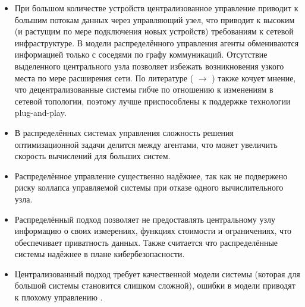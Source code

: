 \documentclass{report}
\begin{document}
\begin{itemize}

\item
При большом количестве устройств централизованное управление приводит к большим потокам данных через управляющий узел, что приводит к высоким (и растущим по мере подключения новых устройств) требованиям к сетевой инфраструктуре.
В модели распределённого управления агенты обмениваются информацией только с соседями по графу коммуникаций.
Отсутствие выделенного центрального узла позволяет избежать возникновения узкого места по мере расширения сети.
По литературе (\cite{binetti2014distributed} $\rightarrow$ \cite{elsayed2014fully}) также кочует мнение, что децентрализованные системы гибче по отношению к изменениям в сетевой топологии, поэтому лучше приспособлены к поддержке технологии plug-and-play.

\item
В распределённых системах управления сложность решения оптимизационной задачи делится между агентами, что может увеличить скорость вычислений для больших систем.

\item
Распределённое управление существенно надёжнее, так как не подвержено риску коллапса управляемой системы при отказе одного вычислительного узла.

\item
Распределённый подход позволяет не предоставлять центральному узлу информацию о своих измерениях, функциях стоимости и ограничениях, что обеспечивает приватность данных.
Также считается \cite{loia2013decentralized,molzahn2017survey} что распределённые системы надёжнее в плане кибербезопасности.

\item
Централизованный подход требует качественной модели системы (которая для большой системы становится слишком сложной), ошибки в модели приводят к плохому управлению \cite{binetti2014distributed}.


\end{itemize}
\end{document}
